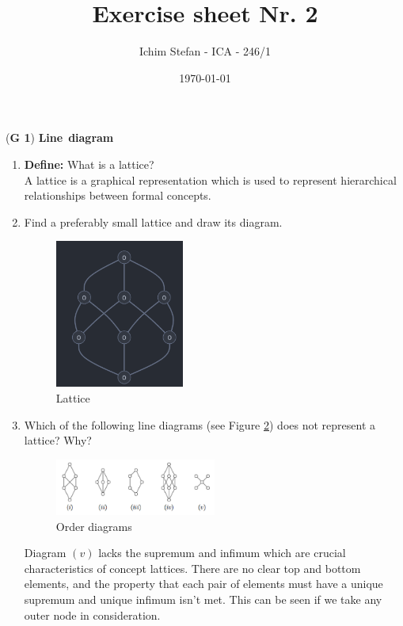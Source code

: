 \documentclass{article}
\title{Exercise sheet Nr. 2}
\author{Ichim Stefan - ICA - 246/1}
\date{\today}
\begin{document}
\maketitle

\left(\textbf{G 1}\right) \textbf{Line}\ \textbf{diagram}

\begin{enumerate}[label=\alph*)]
  \item \textbf{Define:} What is a lattice? \\
      A lattice is a graphical representation which is used to represent hierarchical relationships between formal concepts.

  \item Find a preferably small lattice and draw its diagram. \\
  \begin{figure}[htbp]
    \centering
    \includegraphics[width=0.4\textwidth]{g1b_lattice.png}
    \caption{Lattice}
    \label{fig}
  \end{figure}

\item Which of the following line diagrams (see Figure \ref{order_diagrams}) does not represent a lattice? Why? \\
  \begin{figure}[htbp]
    \centering
    \includegraphics[width=0.5\textwidth]{g1c_lattices.png}
    \caption{Order diagrams}
    \label{order_diagrams}
  \end{figure}
    Diagram $(v)$ lacks the supremum and infimum which are crucial characteristics of concept lattices. There are no clear top and bottom elements, and the property that each pair of elements must have a unique supremum and unique infimum isn't met. This can be seen if we take any outer node in consideration.

\end{enumerate}
\end{document}
